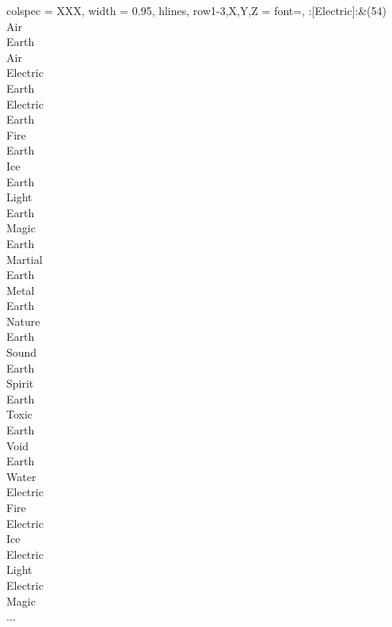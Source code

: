 \begin{longtblr}[
	caption = {2v1 Defending Resisted},
	label = {2v1-Defending-Resisted},
]{
	colspec = {XXX}, width = 0.95\linewidth,
	hlines,
	row{1-3,X,Y,Z} = {font=\bfseries},
}
	:[Electric]:&{(54)\\
	Air \\
	Earth \\
	Air \\
	Electric \\
	Earth \\
	Electric \\
	Earth \\
	Fire \\
	Earth \\
	Ice \\
	Earth \\
	Light \\
	Earth \\
	Magic \\
	Earth \\
	Martial \\
	Earth \\
	Metal \\
	Earth \\
	Nature \\
	Earth \\
	Sound \\
	Earth \\
	Spirit \\
	Earth \\
	Toxic \\
	Earth \\
	Void \\
	Earth \\
	Water \\
	Electric \\
	Fire \\
	Electric \\
	Ice \\
	Electric \\
	Light \\
	Electric \\
	Magic \\
	...\\
	}\\


\end{longtblr}
